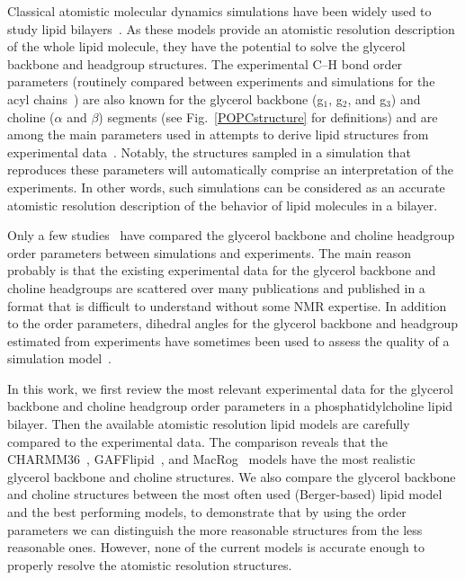\documentclass[journal=jacsat,manuscript=article]{achemso}
\begin{document}
Classical atomistic molecular dynamics simulations have been widely used to study  
lipid bilayers~\cite{tieleman97,klauda08,edholm08,tieleman10,piggot12,rabinovich13}. As these models provide an atomistic
resolution description of the whole lipid molecule, they have the potential to solve the glycerol backbone and 
headgroup structures. The experimental C--H bond order parameters
(routinely compared between experiments and simulations for the acyl chains~\cite{tieleman97,klauda08,edholm08,tieleman10,piggot12})
are also known for the glycerol backbone 
(g$_1$, g$_2$, and g$_3$) and choline ($\alpha$ and $\beta$) segments (see Fig.~\ref{POPCstructure} for definitions) and are among the main parameters used in
attempts to derive lipid structures from experimental data~\cite{seelig77b,skarjune79,jacobs80,davis83,akutsu91,hong95b,semchyschyn04}.
Notably, the structures sampled in a simulation that reproduces these 
parameters will automatically comprise an interpretation of the experiments. In other words, such simulations can be considered as an accurate atomistic resolution description of
the behavior of lipid molecules in a bilayer.

Only a few studies~\cite{shinoda97,hogberg08,castro08,klauda10,kapla12,dickson12,poger12,ferreira13,chowdhary13,maciejewski14}
have compared
the glycerol backbone and choline headgroup order parameters between simulations and experiments. 
The main reason probably is that the existing experimental data for the glycerol backbone
and choline headgroups are scattered over many publications and published in a format that is difficult to understand without some NMR expertise. 
In addition to the order parameters, dihedral angles for the glycerol backbone and headgroup estimated from experiments have sometimes been used to 
assess the quality of a simulation model~\cite{robinson94,essex94,kothekar96,hyvonen97,shinoda97,duong99}.

In this work, we first review the most relevant experimental data for the glycerol backbone and choline headgroup order parameters
in a phosphatidylcholine lipid bilayer. Then the available atomistic resolution lipid models are carefully compared to the 
experimental data. The comparison reveals that the CHARMM36~\cite{klauda10}, GAFFlipid~\cite{dickson12}, and MacRog~\cite{maciejewski14} models
have the most realistic glycerol backbone and choline structures. We also compare the glycerol backbone and choline 
structures between the most often used (Berger-based) lipid model~\cite{berger97} 
and the best performing models, to demonstrate that by using the 
order parameters we can distinguish the more reasonable structures from the less reasonable ones. However, none of the current models 
is accurate enough to properly resolve the atomistic resolution structures.
\end{document}
